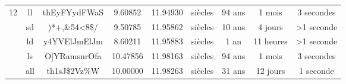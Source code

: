 \begin{table}[H]
{\begin{tabular}{lcccccccc}
			\multirow{5}{*}{12}                               & ll                           & thEyFYydFWaS                                     & 9.60852                                                                            & 11.94930                                                                                        & siècles                                                            & 94 ans                                                               & 1 mois                                                             & 3 secondes                                                            \\ \cline{2-9} 
			& sd                           & )*+,\&54<8\texttildelow\$/ & 9.50785                                                                           & 11.95862                                                                                       & siècles                                                            & 10 ans                                                               & 4 jours                                                            & \textgreater 1 seconde                                               \\ \cline{2-9} 
			& ld                           & y4YVElJmElJm                                  & 8.60211                                                                             & 11.95883                                                                                      & siècles                                                            & 1 an                                                              & 11 heures                                                              & \textgreater 1 seconde                                               \\ \cline{2-9} 
			& ls                           & O]YRamsnrOfa                                    & 10.47856                                                                             & 11.98163                                                                                       & siècles                                                            & 94 ans                                                               & 1 mois                                                             & 3 secondes                                             \\ \cline{2-9} 
			& all                           &      th1s\textbraceleft J\$2Vz\%W                              & 10.00000                                                                            & 11.98263                                                                                       & siècles                                                            & 31 ans                                                               & 12 jours                                                             & 1 seconde                                                           \\ \hline\hline

\end{tabular}}
\end{table}
